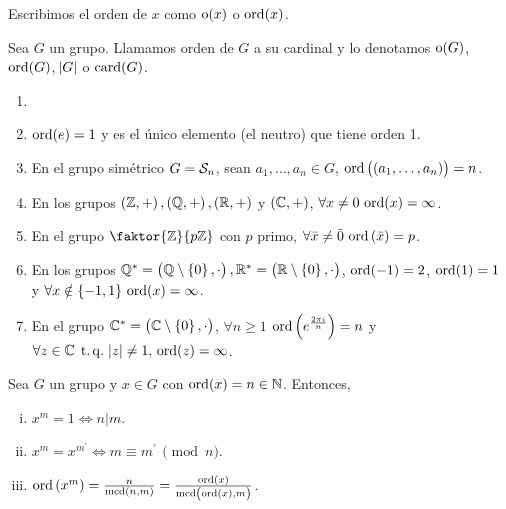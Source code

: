 \begin{obs}
    Escribimos el orden de $x$ como $\operatorname{o}(x)$ o $\operatorname{ord}(x)$.
\end{obs}

\begin{defi}
    Sea $G$ un grupo. Llamamos orden de $G$ a su cardinal y lo denotamos $\operatorname{o}(G)$, $\operatorname{ord}(G)$, $\abs{G}$ o $\operatorname{card}(G)$.
\end{defi}

\begin{example}
    \begin{enumerate}[1.]
        \item[]
        \item $\operatorname{ord}(e) = 1$ y es el único elemento (el neutro) que tiene orden 1.
        \item En el grupo simétrico $G = \mathcal{S}_n$, sean $a_1, \dots, a_n \in G$, $\operatorname{ord}\left(\left( a_1, \dots, a_n \right)\right) = n$.
        \item En los grupos $\left( \mathbb{Z}, +\right) , \left( \mathbb{Q}, +\right), \left( \mathbb{R}, +\right)$ y $\left( \mathbb{C}, +\right)$, $\forall x \neq 0 \, \operatorname{ord}(x) = \infty$.
        \item En el grupo $\faktor{\z}{p\z}$ con $p$ primo, $\forall \bar{x} \neq \bar{0} \, \operatorname{ord}\left( \bar{x} \right) = p$.
        \item En los grupos $\mathbb{Q}^{\ast}=\left( \mathbb{Q}\setminus \left\{ 0\right\}, \cdot \right), \mathbb{R}^{\ast}=\left( \mathbb{R}\setminus \left\{ 0\right\}, \cdot\right)$, $\operatorname{ord}(-1) = 2$, $\operatorname{ord}(1) = 1$ y $\forall x \notin \left\{-1, 1\right\} \, \operatorname{ord}(x) = \infty$.
        \item En el grupo $\mathbb{C}^{\ast}=\left( \mathbb{C}\setminus \left\{ 0\right\}, \cdot \right)$, $\forall n \geq 1$ $\operatorname{ord}\left( e^{\frac{2 \pi i}{n}} \right) = n$ y $\forall z \in \mathbb{C} \operatorname{\;t.q.\;} \abs{z} \neq 1, \, \operatorname{ord}(z) = \infty$.
    \end{enumerate}
\end{example}

\begin{lema}
    Sea $G$ un grupo y $x \in G$ con $\operatorname{ord}(x) = n\in\mathbb{N}$. Entonces,
    \begin{enumerate}[i)]
        \item $x^m = 1 \iff n \vert m$.
        \item $x^m = x^{m^\prime} \iff m \equiv m^\prime \, \pmod{n}$.
        \item $\operatorname{ord}\left( x^m \right) = \frac{n}{\operatorname{mcd}(n, m)} = \frac{\operatorname{ord}(x)}{\operatorname{mcd}\left( \operatorname{ord}(x), m \right)}$.
    \end{enumerate}
\end{lema}

